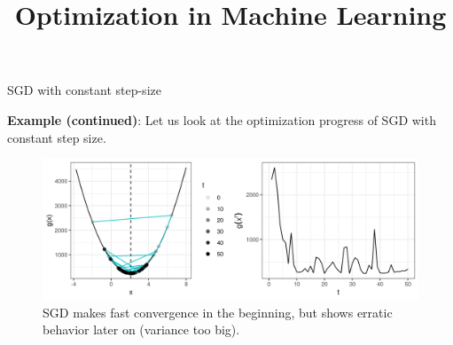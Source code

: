 \documentclass[11pt,compress,t,notes=noshow, xcolor=table]{beamer}
\title{Optimization in Machine Learning}
\date{}
\begin{document}
\sloppy


\begin{vbframe}{SGD with constant step-size}

\textbf{Example (continued)}: Let us look at the optimization progress of SGD with constant step size. 

 	\begin{figure}
 		\vspace{-0.3cm}
 		\centering
 		\includegraphics[width = 1\textwidth]{figure_man/sgd_example_erratic_behavior.png} \newline
		SGD makes fast convergence in the beginning, but shows erratic behavior later on (variance too big). 
 	\end{figure}

\end{vbframe}
\end{document}
